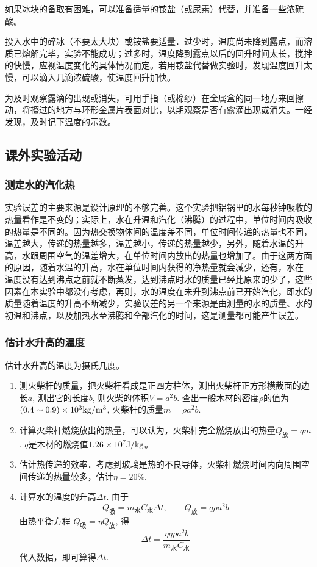 如果冰块的备取有困难，可以准备适量的铵盐（或尿素）代替，并准备一些浓硫酸。

投入水中的碎冰（不要太大块）或铵盐要适量．过少时，温度尚未降到露点，而溶质已熔解完毕，实验不能成功；过多时，温度降到露点以后的回升时间太长，搅拌的快慢，应视温度变化的具体情况而定。若用铵盐代替做实验时，发现温度回升太慢，可以滴入几滴浓硫酸，使温度回升加快。

为及时观察露滴的出现或消失，可用手指（或棉纱）在金属盒的同一地方来回擦动，将擦过的地方与环形金属片表面对比，以期观察是否有露滴出现或消失。一经发现，及时记下温度的示数。

\subsection{课外实验活动}
\subsubsection{测定水的汽化热}

实验误差的主要来源是设计原理的不够完善。这个实验把铝锅里的水每秒钟吸收的热量看作是不变的；实际上，水在升温和汽化（沸腾）的过程中，单位时间内吸收的热量是不同的。因为热交换物体间的温度差不同，单位时间传递的热量也不同，温差越大，传递的热量越多，温差越小，传递的热量越少，另外，随着水温的升高，水跟周围空气的温差增大，在单位时间内放出的热量也增加了。由于这两方面的原因，随着水温的升高，水在单位时间内获得的净热量就会减少，还有，水在
温度没有达到沸点之前就不断蒸发，达到沸点时水的质量已经比原来的少了，这些因素在本实验中都没有考虑，再则，水的温度在未升到沸点前已开始汽化，即水的质量随着温度的升高不断减少，实验误差的另一个来源是由测量的水的质量、水的初温和沸点，以及加热水至沸腾和全部汽化的时间，这是测量都可能产生误差。

\subsubsection{估计水升高的温度}

估计水升高的温度为摄氏几度。

\begin{enumerate}
    \item 测火柴杆的质量，把火柴杆看成是正四方柱体，测出火柴杆正方形横截面的边长$a$, 测出它的长度$b$, 则火柴的体积$V=a^2b$. 查出一般木材的密度$\rho$的值为$(0.4\sim 0.9)\times10^3{\rm kg/m^3}$, 火柴杆的质量$m=\rho a^2b$.
    \item 计算火柴杆燃烧放出的热量，可以认为，火柴杆完全燃烧放出的热量$Q_{\text{放}}=qm$. $q$是木材的燃烧值$1.26\times10^7{\rm J/kg}$。
    \item 估计热传递的效率．考虑到玻璃是热的不良导体，火柴杆燃烧时间内向周围空间传递的热量较多，估计$\eta=20\%$.
    \item 计算水的温度的升高$\Delta t$. 由于
    \[Q_{\text{吸}}=m_{\text{水}}C_{\text{水}}\Delta t,\qquad Q_{\text{放}}=q\rho a^2b\]
    由热平衡方程 $Q_{\text{吸}}=\eta Q_{\text{放}}$, 得
    \[\Delta t=\frac{\eta q\rho a^2b}{m_{\text{水}}C_{\text{水}}}\]
    代入数据，即可算得$\Delta t$.
\end{enumerate}










